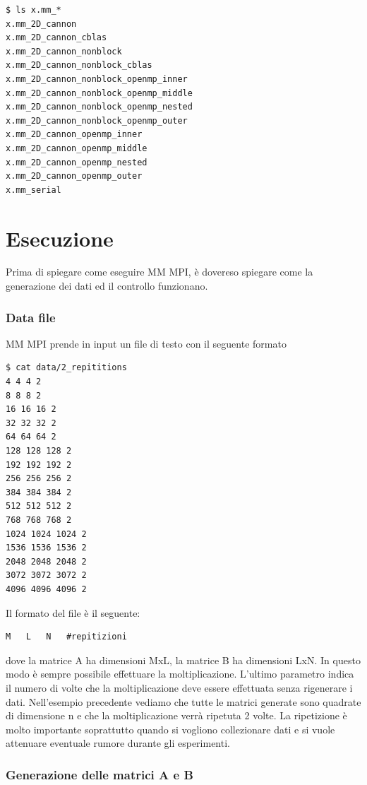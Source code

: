 \begin{lstlisting}
$ ls x.mm_*
x.mm_2D_cannon
x.mm_2D_cannon_cblas
x.mm_2D_cannon_nonblock
x.mm_2D_cannon_nonblock_cblas
x.mm_2D_cannon_nonblock_openmp_inner
x.mm_2D_cannon_nonblock_openmp_middle
x.mm_2D_cannon_nonblock_openmp_nested
x.mm_2D_cannon_nonblock_openmp_outer
x.mm_2D_cannon_openmp_inner
x.mm_2D_cannon_openmp_middle
x.mm_2D_cannon_openmp_nested
x.mm_2D_cannon_openmp_outer
x.mm_serial
\end{lstlisting}

\section{Esecuzione}

Prima di spiegare come eseguire MM MPI, \`{e} dovereso spiegare come la generazione dei dati ed il controllo funzionano.

\subsubsection{Data file}
MM MPI prende in input un file di testo con il seguente formato

\begin{lstlisting}
$ cat data/2_repititions
4 4 4 2
8 8 8 2
16 16 16 2
32 32 32 2
64 64 64 2
128 128 128 2
192 192 192 2
256 256 256 2
384 384 384 2
512 512 512 2
768 768 768 2
1024 1024 1024 2
1536 1536 1536 2
2048 2048 2048 2
3072 3072 3072 2
4096 4096 4096 2
\end{lstlisting}

Il formato del file \`{e} il seguente:

\begin{lstlisting}
M   L   N   #repitizioni
\end{lstlisting}

dove la matrice A ha dimensioni MxL, la matrice B ha dimensioni LxN. In questo modo \`{e} sempre possibile effettuare la moltiplicazione. L'ultimo parametro indica il numero di volte che la moltiplicazione deve essere effettuata senza rigenerare i dati. Nell'esempio precedente vediamo che tutte le matrici generate sono quadrate di dimensione n e che la moltiplicazione verr\`{a} ripetuta 2 volte.
La ripetizione \`{e} molto importante soprattutto quando si vogliono collezionare dati e si vuole attenuare eventuale rumore durante gli esperimenti.

\subsubsection{Generazione delle matrici A e B}

